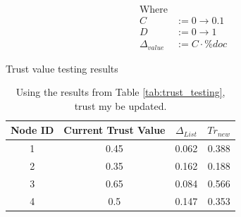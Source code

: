 \begin{table}[h!]
\begin{align*}
    \text{Where}& \\
    C &:= 0 \to 0.1 \\
    D &:= 0 \to 1 \\
    \Delta_{value} &:= C \cdot \%doc
\end{align*}
    \caption{Trust value testing results}
    \label{tab:trust_testing}
\end{table}

\begin{table}[h!]
    \centering
\begin{tabular}{c | c | c | c}
    \hline
    Node ID	& Current Trust Value &	\( \Delta_{List} \) & \( Tr_{new} \)\\
    \hline \hline
1       & 0.45                & 0.062    &    0.388 \\
2       & 0.35                & 0.162    &    0.188 \\
3       & 0.65                & 0.084    &    0.566 \\
4       & 0.5                 & 0.147    &    0.353 \\
\end{tabular}
\caption{Using the results from Table \ref{tab:trust_testing}, trust my be
updated.}
\label{tab:trust_evaulation}
\end{table}
